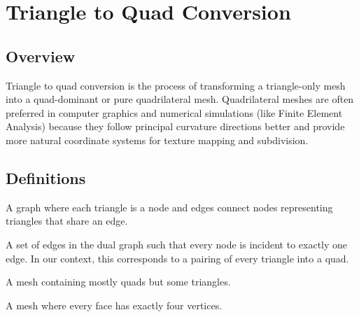 \section{Triangle to Quad Conversion}
\label{sec:triangle_to_quad}

\subsection{Overview}
Triangle to quad conversion is the process of transforming a triangle-only mesh into a quad-dominant or pure quadrilateral mesh\cite{remacle2012,bommes2013}. Quadrilateral meshes are often preferred in computer graphics and numerical simulations (like Finite Element Analysis) because they follow principal curvature directions better and provide more natural coordinate systems for texture mapping and subdivision.

\subsection{Definitions}
\begin{definition}\label{def:dual_graph_tri2quad}
A graph where each triangle is a node and edges connect nodes representing triangles that share an edge.
\end{definition}

\begin{definition}\label{def:perfect_matching}
A set of edges in the dual graph such that every node is incident to exactly one edge. In our context, this corresponds to a pairing of every triangle into a quad.
\end{definition}

\begin{definition}\label{def:quad_dominant}
A mesh containing mostly quads but some triangles.
\end{definition}

\begin{definition}\label{def:pure_quad}
A mesh where every face has exactly four vertices.
\end{definition}

